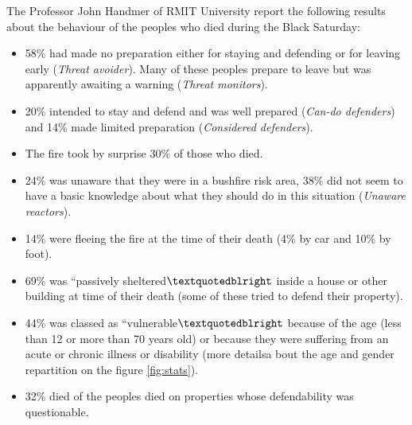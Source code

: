 \documentclass[12pt, a4paper]{memoir} %
\begin{document}
	The Professor John Handmer of RMIT University report the following results about the behaviour of the peoples
	who died during the Black Saturday\cite{stats2009}:
	\begin{itemize}
		\item 58\% had made no preparation either for staying and defending or for leaving early (\textit{Threat avoider}). Many of these peoples
		prepare to leave but was apparently awaiting a warning (\textit{Threat monitors}).
		\item 20\% intended to stay and defend and was well prepared (\textit{Can-do defenders}) and 14\% made limited preparation (\textit{Considered defenders}).
		\item The fire took by surprise 30\% of those who died.
		\item 24\% was unaware that they were in a bushfire risk area, 38\% did not seem to have a basic knowledge about what they should do in this situation (\textit{Unaware reactors}).
		\item 14\% were fleeing the fire at the time of their death (4\% by car and 10\% by foot).
		\item 69\% was \textquotedblleft passively sheltered$\textquotedblright$ inside a house or other building at time of their death (some of these tried to defend their property).
		\item 44\% was classed as \textquotedblleft vulnerable$\textquotedblright$ because of the age (less than 12 or more than 70 years old) or because
		they were suffering from an acute or chronic illness or disability (more detailsa bout the age and gender repartition on the figure \ref{fig:stats}).
		\item 32\% died of the peoples died on properties whose defendability was questionable.
	\end{itemize}
\end{document}
